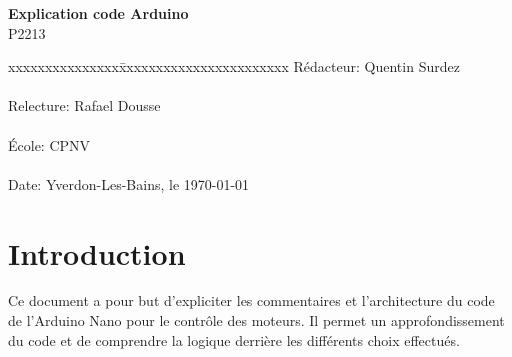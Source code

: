 \documentclass[
	a4paper,									%
	11pt,										%
	twoside,									%
	openright,									%
	notitlepage,									%
	parskip=half,								%
]{scrreprt}										%
\begin{document}
\begin{titlepage}
	\vspace{3cm}

	\fontsize{30pt}{32pt}\selectfont 
	\noindent \textbf{Explication code Arduino} \\

	\fontsize{18pt}{20pt}\selectfont\vspace{0.3em} P2213 \\

	\vspace{4cm}
	\fontsize{12pt}{15pt}\selectfont
	\begin{tabbing}
		xxxxxxxxxxxxxxx\=xxxxxxxxxxxxxxxxxxxxxxx \kill
		Rédacteur:\> Quentin Surdez\\ \\
		Relecture:\> Rafael Dousse\\ \\
		École:\> CPNV\\ \\
		Date:\> Yverdon-Les-Bains, le \today \\
	\end{tabbing}
\end{titlepage}

\tableofcontents

\listoffigures									%
\listoflistings %
\cleardoublepage

\setcounter{page}{1}

\chapter{Introduction}
Ce document a pour but d'expliciter les commentaires et l'architecture du code de l'Arduino Nano pour le contrôle des moteurs. Il permet un approfondissement du code et de comprendre la logique derrière 
les différents choix effectués.

\end{document}
